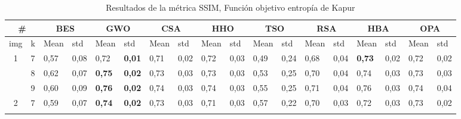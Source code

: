 \documentclass[conference]{IEEEtran}
\begin{document}
\begin{table}[]
	\caption{Resultados de la métrica SSIM, Función objetivo entropía de Kapur}
	\begin{tabular}{|cl|ll|ll|ll|ll|ll|ll|ll|ll|}
		\hline
		\multicolumn{2}{|c|}{\#} & \multicolumn{2}{c|}{BES} & \multicolumn{2}{c|}{GWO} & \multicolumn{2}{c|}{CSA} & \multicolumn{2}{c|}{HHO} & \multicolumn{2}{c|}{TSO} & \multicolumn{2}{c|}{RSA} & \multicolumn{2}{c|}{HBA} & \multicolumn{2}{c|}{OPA} \\ \hline
		\multicolumn{1}{|l|}{img}                 & k & \multicolumn{1}{l|}{Mean} & std           & \multicolumn{1}{l|}{Mean}          & std           & \multicolumn{1}{l|}{Mean}          & std  & \multicolumn{1}{l|}{Mean}          & std  & \multicolumn{1}{l|}{Mean}                 & std  & \multicolumn{1}{l|}{Mean} & std  & \multicolumn{1}{l|}{Mean}          & std           & \multicolumn{1}{l|}{Mean}          & std           \\ \hline
		\multicolumn{1}{|c|}{\multirow{3}{*}{1}}  & 7 & \multicolumn{1}{l|}{0,57} & 0,08          & \multicolumn{1}{l|}{0,72}          & \textbf{0,01} & \multicolumn{1}{l|}{0,71}          & 0,02 & \multicolumn{1}{l|}{0,72}          & 0,03 & \multicolumn{1}{l|}{0,49}                 & 0,24 & \multicolumn{1}{l|}{0,68} & 0,04 & \multicolumn{1}{l|}{\textbf{0,73}} & 0,02          & \multicolumn{1}{l|}{0,72}          & 0,02          \\ \cline{2-18} 
		\multicolumn{1}{|c|}{}                    & 8 & \multicolumn{1}{l|}{0,62} & 0,07          & \multicolumn{1}{l|}{\textbf{0,75}} & \textbf{0,02} & \multicolumn{1}{l|}{0,73}          & 0,03 & \multicolumn{1}{l|}{0,73}          & 0,03 & \multicolumn{1}{l|}{0,53}                 & 0,25 & \multicolumn{1}{l|}{0,70} & 0,04 & \multicolumn{1}{l|}{0,74}          & 0,03          & \multicolumn{1}{l|}{0,73}          & 0,03          \\ \cline{2-18} 
		\multicolumn{1}{|c|}{}                    & 9 & \multicolumn{1}{l|}{0,60} & 0,09          & \multicolumn{1}{l|}{\textbf{0,76}} & \textbf{0,02} & \multicolumn{1}{l|}{0,74}          & 0,03 & \multicolumn{1}{l|}{0,74}          & 0,03 & \multicolumn{1}{l|}{0,55}                 & 0,25 & \multicolumn{1}{l|}{0,71} & 0,04 & \multicolumn{1}{l|}{0,76}          & 0,03          & \multicolumn{1}{l|}{0,74}          & 0,04          \\ \hline
		\multicolumn{1}{|c|}{\multirow{3}{*}{2}}  & 7 & \multicolumn{1}{l|}{0,59} & 0,07          & \multicolumn{1}{l|}{\textbf{0,74}} & \textbf{0,02} & \multicolumn{1}{l|}{0,73}          & 0,03 & \multicolumn{1}{l|}{0,71}          & 0,03 & \multicolumn{1}{l|}{0,57}                 & 0,22 & \multicolumn{1}{l|}{0,70} & 0,03 & \multicolumn{1}{l|}{0,72}          & 0,03          & \multicolumn{1}{l|}{0,73}          & 0,02          \\ \cline{2-18} 

\end{tabular}
\end{table}
\end{document}
